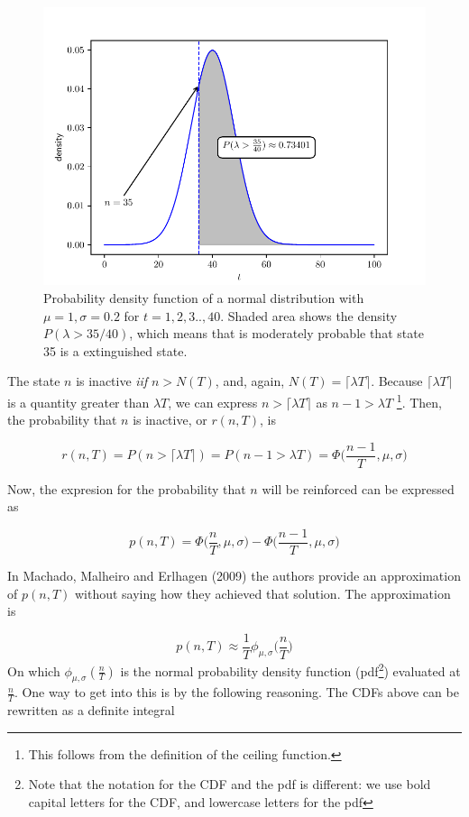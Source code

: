 \documentclass[11pt]{article}
\begin{document}
    \begin{figure}[H]
        \centering
        \includegraphics[scale=0.7]{lambda_nT}
        \caption{Probability density function of a normal distribution with $\mu = 1, \sigma = 0.2$ for $t = 1,2,3..,40$.
        Shaded area shows the density $P(\lambda > 35/40)$, which means that is moderately probable that state 35
        is a extinguished state.}
    \end{figure}

    The state $n$ is inactive \textit{iif} $n > N(T)$, and, again, $N(T) = \lceil \lambda T \rceil$.
    Because $\lceil \lambda T \rceil$ is a quantity greater than $\lambda T$, we can express $n > \lceil \lambda T \rceil$
    as $n - 1 > \lambda T$ \footnote{This follows from the definition of the ceiling function.}.
    Then, the probability that $n$ is inactive, or $r(n,T)$, is

    \[
        r(n,T) = P(n > \lceil \lambda T \rceil) = P(n - 1 > \lambda T) = \Phi \Big( \frac{n-1}{T},\mu,\sigma \Big)
    \]

    Now, the expresion for the probability that $n$ will be reinforced can be expressed as

    \[
        p(n,T) = \Phi \Big ( \frac{n}{T}, \mu, \sigma \Big) - \Phi \Big ( \frac{n - 1}{T},\mu,\sigma \Big)
    \]

    In Machado, Malheiro and Erlhagen (2009) the authors provide an approximation of $p(n,T)$ without saying how they
    achieved that solution. The approximation is

    \[
        p(n,T) \approx \frac{1}{T} \phi_{\mu,\sigma} \Big(\frac{n}{T}\Big)
    \]
    On which $\phi_{\mu,\sigma}(\frac{n}{T})$ is the normal probability density function (pdf\footnote{Note that the notation for the CDF and the pdf is different: we use bold capital letters for the CDF, and lowercase letters for the pdf}) evaluated at $\frac{n}{T}$.
    One way to get into this is by the following reasoning. The CDFs above can be rewritten as a definite integral
\end{document}
